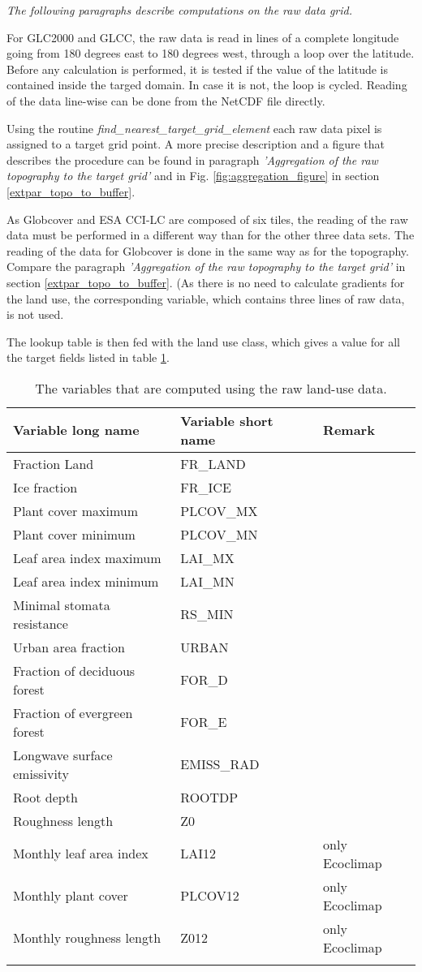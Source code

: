 \documentclass[a4paper,10pt,DIV14,BCOR1cm,titlepage,twoside]{scrartcl}
\providecommand{\tabularnewline}{\\}
\begin{document}
\textit{The following paragraphs describe computations on the raw data grid.} \par\medskip\noindent
For GLC2000 and GLCC, the raw data is read in lines of a complete longitude going from 180 degrees east to 180 degrees west, through a loop over the latitude. Before any calculation is performed, it is tested if the value of the latitude is contained inside the targed domain. In case it is not, the loop is cycled. Reading of the data line-wise can be done from the NetCDF file directly. \par\medskip\noindent
 Using the routine \textit{find\_nearest\_target\_grid\_element} each raw data pixel is assigned to a target grid point. A more precise description and a figure that describes the procedure can be found in paragraph \textit{'Aggregation of the raw topography to the target grid'} and in Fig. \ref{fig:aggregation_figure} in section \ref{extpar_topo_to_buffer}.\par\medskip\noindent
As Globcover and ESA CCI-LC are composed of six tiles, the reading of the raw data must be performed in a different way than for the other three data sets. The reading of the data for Globcover is done in the same way as for the topography. Compare the paragraph \textit{'Aggregation of the raw topography to the target grid'} in section \ref{extpar_topo_to_buffer}. (As there is no need to calculate gradients for the land use, the corresponding variable, which contains three lines of raw data, is not used. \par\medskip\noindent
The lookup table is then fed with the land use class, which gives a value for all the target fields listed in table \ref{tab:target_fields_lu}.\par\medskip
\begin{longtable}{lll}
\textbf{Variable long name} & \textbf{Variable short name} &  \textbf{Remark} \tabularnewline
\hline
\endhead
\hline
Fraction Land & FR\_LAND  \tabularnewline
Ice fraction & FR\_ICE  \tabularnewline
Plant cover maximum & PLCOV\_MX  \tabularnewline
Plant cover minimum & PLCOV\_MN  \tabularnewline
Leaf area index maximum & LAI\_MX  \tabularnewline
Leaf area index minimum & LAI\_MN  \tabularnewline
Minimal stomata resistance & RS\_MIN  \tabularnewline
Urban area fraction & URBAN  \tabularnewline
Fraction of deciduous forest & FOR\_D  \tabularnewline
Fraction of evergreen forest & FOR\_E  \tabularnewline
Longwave surface emissivity & EMISS\_RAD  \tabularnewline
Root depth & ROOTDP  \tabularnewline
Roughness length & Z0  \tabularnewline
Monthly leaf area index & LAI12 & only Ecoclimap \tabularnewline
Monthly plant cover & PLCOV12 & only Ecoclimap \tabularnewline
Monthly roughness length & Z012 & only Ecoclimap \tabularnewline
\bottomrule
\caption{The variables that are computed using the raw land-use data.}
\label{tab:target_fields_lu}
\end{longtable}
\end{document}
